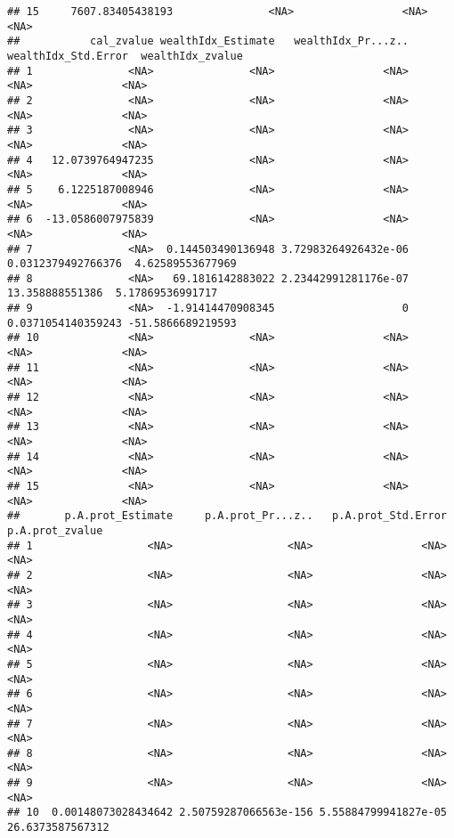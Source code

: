 \documentclass[
]{book}
\begin{document}
\begin{verbatim}
## 15     7607.83405438193               <NA>                 <NA>                <NA>
##           cal_zvalue wealthIdx_Estimate   wealthIdx_Pr...z.. wealthIdx_Std.Error  wealthIdx_zvalue
## 1               <NA>               <NA>                 <NA>                <NA>              <NA>
## 2               <NA>               <NA>                 <NA>                <NA>              <NA>
## 3               <NA>               <NA>                 <NA>                <NA>              <NA>
## 4   12.0739764947235               <NA>                 <NA>                <NA>              <NA>
## 5    6.1225187008946               <NA>                 <NA>                <NA>              <NA>
## 6  -13.0586007975839               <NA>                 <NA>                <NA>              <NA>
## 7               <NA>  0.144503490136948 3.72983264926432e-06  0.0312379492766376  4.62589553677969
## 8               <NA>   69.1816142883022 2.23442991281176e-07     13.358888551386  5.17869536991717
## 9               <NA>  -1.91414470908345                    0  0.0371054140359243 -51.5866689219593
## 10              <NA>               <NA>                 <NA>                <NA>              <NA>
## 11              <NA>               <NA>                 <NA>                <NA>              <NA>
## 12              <NA>               <NA>                 <NA>                <NA>              <NA>
## 13              <NA>               <NA>                 <NA>                <NA>              <NA>
## 14              <NA>               <NA>                 <NA>                <NA>              <NA>
## 15              <NA>               <NA>                 <NA>                <NA>              <NA>
##       p.A.prot_Estimate     p.A.prot_Pr...z..   p.A.prot_Std.Error   p.A.prot_zvalue
## 1                  <NA>                  <NA>                 <NA>              <NA>
## 2                  <NA>                  <NA>                 <NA>              <NA>
## 3                  <NA>                  <NA>                 <NA>              <NA>
## 4                  <NA>                  <NA>                 <NA>              <NA>
## 5                  <NA>                  <NA>                 <NA>              <NA>
## 6                  <NA>                  <NA>                 <NA>              <NA>
## 7                  <NA>                  <NA>                 <NA>              <NA>
## 8                  <NA>                  <NA>                 <NA>              <NA>
## 9                  <NA>                  <NA>                 <NA>              <NA>
## 10  0.00148073028434642 2.50759287066563e-156 5.55884799941827e-05  26.6373587567312

\end{verbatim}
\end{document}
